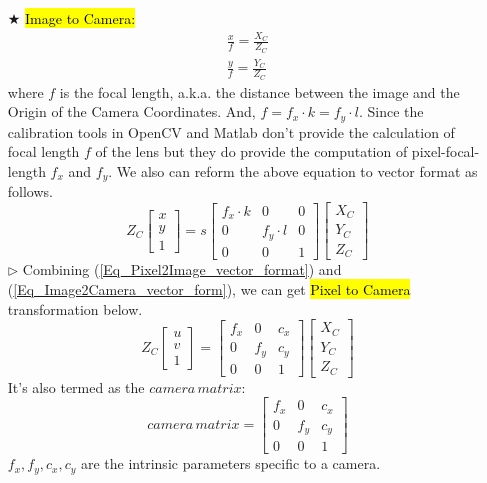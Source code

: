 \documentclass{article}
\begin{document}
\begin{itemize}
	\item [$\bigstar$] \hl{Image to Camera:}
		\begin{equation}
			\begin{array}{l}
				\frac{x}{f} = \frac{X_C}{Z_C}\\
				\frac{y}{f} = \frac{Y_C}{Z_C}
			\end{array}
			\label{Eq_Image2Camera}
		\end{equation}
		where $f$ is the focal length, a.k.a. the distance between the image and the Origin of the Camera Coordinates. And, $f=f_x \cdot k=f_y \cdot l$. Since the calibration tools in OpenCV and Matlab don't provide the calculation of focal length $f$ of the lens but they do provide the computation of pixel-focal-length $f_x$ and $f_y$. We also can reform the above equation to vector format as follows.
		\begin{equation}
		Z_C \left[\begin{array}{l}
		x \\
		y \\
		1
		\end{array}\right]=s\left[\begin{array}{lll}
		f_{x}\cdot k & 0 & 0 \\
		0 & f_{y}\cdot l & 0 \\
		0 & 0 & 1
		\end{array}\right]\left[\begin{array}{l}
		X_C \\
		Y_C \\
		Z_C
		\end{array}\right]			
		\label{Eq_Image2Camera_vector_form}
		\end{equation}
		$\rhd$ Combining (\ref{Eq_Pixel2Image_vector_format}) and (\ref{Eq_Image2Camera_vector_form}), we can get \hl{Pixel to Camera} transformation below.
		\begin{equation}
		Z_C \left[\begin{array}{l}
		u \\
		v \\
		1
		\end{array}\right]=\left[\begin{array}{lll}
		f_{x} & 0 & c_{x} \\
		0 & f_{y} & c_{y} \\
		0 & 0 & 1
		\end{array}\right]\left[\begin{array}{l}
		X_C \\
		Y_C \\
		Z_C
		\end{array}\right]			
		\label{Eq_Pixel2Camera_vector_form}
		\end{equation}
		It's also termed as the $camera\,matrix$:
		  \begin{equation}
		  camera\,matrix = \left[\begin{array}{lll}
		  f_{x} & 0 & c_{x} \\
		  0 & f_{y} & c_{y} \\
		  0 & 0 & 1
		  \end{array}\right]		
		  \label{Eq_camera_matrix}
		  \end{equation}
		$f_x,f_y,c_x,c_y$ are the intrinsic parameters specific to a camera. 
		

\end{itemize}
\end{document}
